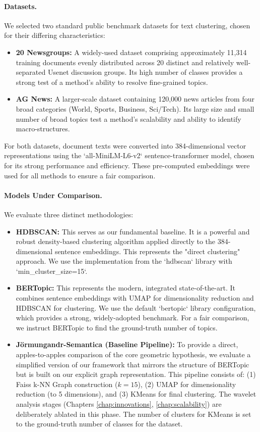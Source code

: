 \paragraph{Datasets.} We selected two standard public benchmark datasets for text clustering, chosen for their differing characteristics:
\begin{itemize}
    \item \textbf{20 Newsgroups:} A widely-used dataset comprising approximately 11,314 training documents evenly distributed across 20 distinct and relatively well-separated Usenet discussion groups. Its high number of classes provides a strong test of a method's ability to resolve fine-grained topics.
    \item \textbf{AG News:} A larger-scale dataset containing 120,000 news articles from four broad categories (World, Sports, Business, Sci/Tech). Its large size and small number of broad topics test a method's scalability and ability to identify macro-structures.
\end{itemize}
For both datasets, document texts were converted into 384-dimensional vector representations using the `all-MiniLM-L6-v2` sentence-transformer model, chosen for its strong performance and efficiency. These pre-computed embeddings were used for all methods to ensure a fair comparison.

\paragraph{Models Under Comparison.} We evaluate three distinct methodologies:
\begin{itemize}
    \item \textbf{HDBSCAN:} This serves as our fundamental baseline. It is a powerful and robust density-based clustering algorithm applied directly to the 384-dimensional sentence embeddings. This represents the "direct clustering" approach. We use the implementation from the `hdbscan` library with `min\_cluster\_size=15`.
    \item \textbf{BERTopic:} This represents the modern, integrated state-of-the-art. It combines sentence embeddings with UMAP for dimensionality reduction and HDBSCAN for clustering. We use the default `bertopic` library configuration, which provides a strong, widely-adopted benchmark. For a fair comparison, we instruct BERTopic to find the ground-truth number of topics.
    \item \textbf{Jörmungandr-Semantica (Baseline Pipeline):} To provide a direct, apples-to-apples comparison of the core geometric hypothesis, we evaluate a simplified version of our framework that mirrors the structure of BERTopic but is built on our explicit graph representation. This pipeline consists of: (1) Faiss k-NN Graph construction ($k=15$), (2) UMAP for dimensionality reduction (to 5 dimensions), and (3) KMeans for final clustering. The wavelet analysis stages (Chapters \ref{chap:innovations}, \ref{chap:scalability}) are deliberately ablated in this phase. The number of clusters for KMeans is set to the ground-truth number of classes for the dataset.
\end{itemize}

